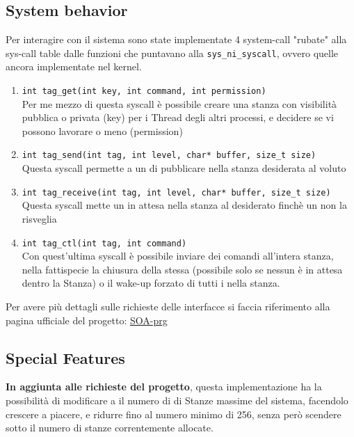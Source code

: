\subsection{System behavior}

Per interagire con il sistema sono state implementate 4 system-call "rubate" alla sys-call table dalle funzioni che
puntavano alla \verb|sys_ni_syscall|, ovvero quelle ancora implementate nel kernel.

\begin{enumerate}
    \item \verb|int tag_get(int key, int command, int permission)|\\
    Per me mezzo di questa syscall è possibile creare una stanza con visibilità pubblica o privata (key) per i
    Thread degli altri processi, e decidere se vi possono lavorare o meno (permission)
    \item \verb|int tag_send(int tag, int level, char* buffer, size_t size)|\\
    Questa syscall permette a un \Writer di pubblicare nella stanza desiderata al \Topic voluto
    \item \verb|int tag_receive(int tag, int level, char* buffer, size_t size)|\\
    Questa syscall mette un \Reader in attesa nella stanza al \Topic desiderato finchè un \Writer non la risveglia
    \item \verb|int tag_ctl(int tag, int command)|\\
    Con quest'ultima syscall è possibile inviare dei comandi all'intera stanza, nella fattispecie la chiusura della
    stessa (possibile solo se nessun \Reader è in attesa dentro la Stanza) o il wake-up forzato di tutti i \Reader
    nella stanza.
\end{enumerate}
Per avere più dettagli sulle richieste delle interfacce si faccia riferimento alla pagina ufficiale del progetto:
\href{https://francescoquaglia.github.io/TEACHING/AOS/PROJECTS/project-specification-2020-2021.html}{SOA-prg}

\subsection{Special Features} \label{specialFeature}
\textbf{In aggiunta alle richieste del progetto}, questa implementazione ha la possibilità di modificare a
\RunTime il numero di di Stanze massime del sistema, facendolo crescere a piacere, e ridurre fino al numero minimo di
256, senza però scendere sotto il numero di stanze correntemente allocate.


